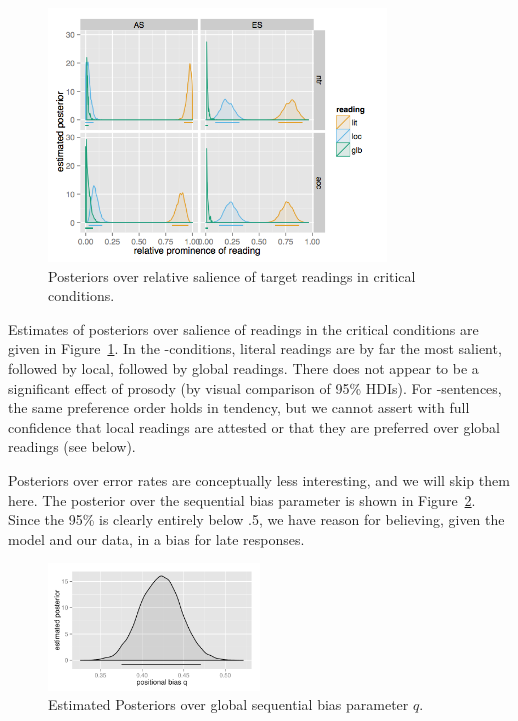 \documentclass[fleqn,reqno,10pt]{article}
\newcommand{\as}{\acro{as}}
\renewcommand{\es}{\acro{es}}
\begin{document}
\begin{figure}
  \centering
  \includegraphics[width=0.8\textwidth]{pics/post_salience_small.png}
  \caption{Posteriors over relative salience of target readings in
    critical conditions.}
  \label{fig:Posterior_T}
\end{figure}

Estimates of posteriors over salience of readings in the critical
conditions are given in Figure~\ref{fig:Posterior_T}. In the
\es-conditions, literal readings are by far the most salient, followed
by local, followed by global readings. There does not appear to be a
significant effect of prosody (by visual comparison of 95\%
HDIs). For \as-sentences, the same preference order holds in tendency,
but we cannot assert with full confidence that local readings are
attested or that they are preferred over global readings (see below).
 
Posteriors over error rates are conceptually less interesting, and we
will skip them here. The posterior over the sequential bias parameter
is shown in Figure~\ref{fig:post_q}. Since the 95\% is clearly
entirely below .5, we have reason for believing, given the model and
our data, in a bias for late responses.

\begin{figure}
  \centering
  \includegraphics[width=0.5\textwidth]{pics/post_q.pdf}
  \caption{Estimated Posteriors over global sequential bias parameter
    $q$.}
  \label{fig:post_q}
\end{figure}
\end{document}
